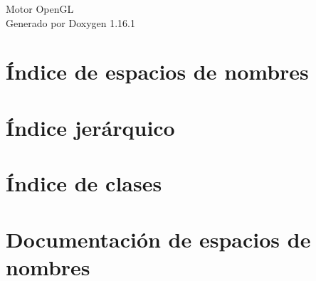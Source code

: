 \documentclass[twoside]{book}
\newcommand{\+}{\discretionary{\mbox{\scriptsize$\hookleftarrow$}}{}{}}
\newcommand{\clearemptydoublepage}{%
    \newpage{\pagestyle{empty}\cleardoublepage}%
  }
\begin{document}
  \raggedbottom
    \hypersetup{pageanchor=false,
                bookmarksnumbered=true,
                pdfencoding=unicode
               }
  \begin{titlepage}
  \vspace*{7cm}
  \begin{center}%
  {\Large Motor Open\+GL}\\
  \vspace*{1cm}
  {\large Generado por Doxygen 1.16.1}\\
  \end{center}
  \end{titlepage}
  \clearemptydoublepage
  \tableofcontents
  \clearemptydoublepage
  \hypersetup{pageanchor=true}







\chapter{Índice de espacios de nombres}

\chapter{Índice jerárquico}

\chapter{Índice de clases}

\chapter{Documentación de espacios de nombres}


\end{document}
